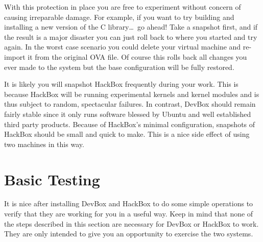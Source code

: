 \documentclass[twocolumn]{article}
\begin{document}
With this protection in place you are free to experiment without concern of causing irreparable
damage. For example, if you want to try building and installing a new version of the C
library\ldots\ go ahead! Take a snapshot first, and if the result is a major disaster you can
just roll back to where you started and try again. In the worst case scenario you could delete
your virtual machine and re-import it from the original OVA file. Of course this rolls back all
changes you ever made to the system but the base configuration will be fully restored.

It is likely you will snapshot HackBox frequently during your work. This is because HackBox will
be running experimental kernels and kernel modules and is thus subject to random, spectacular
failures. In contrast, DevBox should remain fairly stable since it only runs software blessed by
Ubuntu and well established third party products. Because of HackBox's minimal configuration,
snapshots of HackBox should be small and quick to make. This is a nice side effect of using two
machines in this way.

\section{Basic Testing}

It is nice after installing DevBox and HackBox to do some simple operations to verify that they
are working for you in a useful way. Keep in mind that none of the steps described in this
section are necessary for DevBox or HackBox to work. They are only intended to give you an
opportunity to exercise the two systems.
\end{document}
